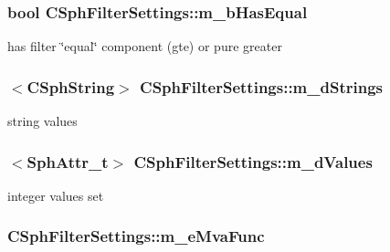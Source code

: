 \hypertarget{classCSphFilterSettings_ae355b2d7bf90822d0d09b5b68f0439fa}{
\subsubsection[{m\-\_\-b\-Has\-Equal}]{\setlength{\rightskip}{0pt plus 5cm}bool C\-Sph\-Filter\-Settings\-::m\-\_\-b\-Has\-Equal}}\label{classCSphFilterSettings_ae355b2d7bf90822d0d09b5b68f0439fa}


has filter \char`\"{}equal\char`\"{} component (gte) or pure greater 

\hypertarget{classCSphFilterSettings_a7ec760e655bf9c839678d09bd7a99278}{
\subsubsection[{m\-\_\-d\-Strings}]{$<${\bf C\-Sph\-String}$>$ C\-Sph\-Filter\-Settings\-::m\-\_\-d\-Strings}}\label{classCSphFilterSettings_a7ec760e655bf9c839678d09bd7a99278}


string values 

\hypertarget{classCSphFilterSettings_a7a260ca2d244d25258227df1e108feb5}{
\subsubsection[{m\-\_\-d\-Values}]{$<${\bf Sph\-Attr\-\_\-t}$>$ C\-Sph\-Filter\-Settings\-::m\-\_\-d\-Values}}\label{classCSphFilterSettings_a7a260ca2d244d25258227df1e108feb5}


integer values set 

\hypertarget{classCSphFilterSettings_a583ba5fb2b8150d3750027ac3f2b2108}{
\subsubsection[{m\-\_\-e\-Mva\-Func}]{ C\-Sph\-Filter\-Settings\-::m\-\_\-e\-Mva\-Func}}\label{classCSphFilterSettings_a583ba5fb2b8150d3750027ac3f2b2108}


